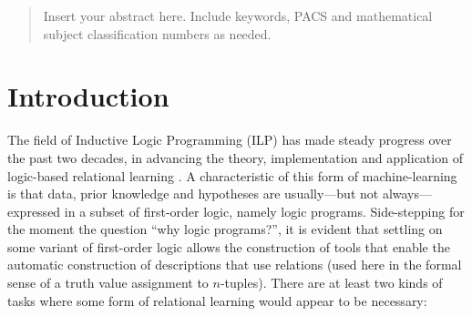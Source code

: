 
\author{Haimonti Dutta        \and
        Ashwin Srinivasan %
}



\date{Received: date / Accepted: date}


\maketitle

\begin{abstract}
Insert your abstract here. Include keywords, PACS and mathematical
subject classification numbers as needed.
\end{abstract}

\section{Introduction}
\label{intro}

The field of Inductive Logic Programming (ILP) has made steady
progress over the past two decades, in advancing the theory,
implementation and application of logic-based relational learning \cite{something}.
A characteristic of this form of machine-learning is that
data, prior knowledge and hypotheses are usually---but not always---expressed in a
subset of first-order logic, namely logic programs.
Side-stepping for the moment the question ``why logic programs?'', it is evident
that settling on some variant of first-order logic allows the construction of tools that
enable the automatic construction of descriptions that use relations
(used here in the formal sense of a truth value assignment to $n$-tuples).
There are at least two kinds of 
tasks where some form of relational learning would appear to be necessary:

